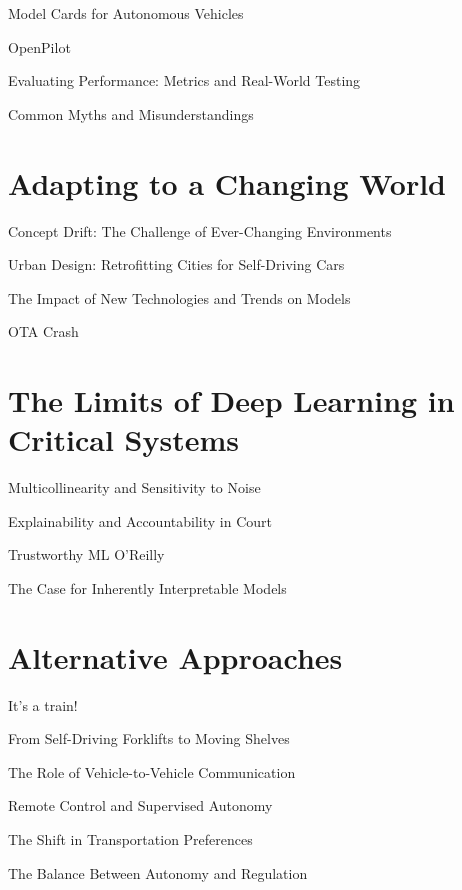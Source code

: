 Model Cards for Autonomous Vehicles

OpenPilot \cite{openpilot}

Evaluating Performance: Metrics and Real-World Testing

Common Myths and Misunderstandings

\section{Adapting to a Changing World}

Concept Drift: The Challenge of Ever-Changing Environments

Urban Design: Retrofitting Cities for Self-Driving Cars

The Impact of New Technologies and Trends on Models

OTA Crash \cite{otacrash}


\section{The Limits of Deep Learning in Critical Systems}

Multicollinearity and Sensitivity to Noise


Explainability and Accountability in Court

Trustworthy ML O'Reilly \cite{trustworthyml}

The Case for Inherently Interpretable Models

\section{Alternative Approaches}

It's a train!

From Self-Driving Forklifts to Moving Shelves

The Role of Vehicle-to-Vehicle Communication

Remote Control and Supervised Autonomy

The Shift in Transportation Preferences

The Balance Between Autonomy and Regulation
